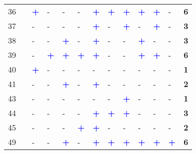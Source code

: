 \begin{longtable}{p{0.5cm}p{4.6cm}p{0.3cm}p{0.3cm}p{0.3cm}p{0.3cm}p{0.3cm}p{0.3cm}p{0.3cm}p{0.3cm}p{0.3cm}p{0.3cm}p{1cm}}
    \small{36} & \small{\textcite{cheng_expanding_2018}}\index{Cheng, Yung-Hsiang|pagebf} & \textcolor{blue}{\textbf{+}} & - & - & - & \textcolor{blue}{\textbf{+}} & \textcolor{blue}{\textbf{+}} & \textcolor{blue}{\textbf{+}} & \textcolor{blue}{\textbf{+}} & \textcolor{blue}{\textbf{+}} & - & \textbf{6}\\
    \small{37} & \small{\textcite{cheng_evaluating_2012}}\index{Cheng, Yung-Hsiang|pagebf} & - & - & - & - & \textcolor{blue}{\textbf{+}} & - & \textcolor{blue}{\textbf{+}} & - & \textcolor{blue}{\textbf{+}} & - & \textbf{3}\\
    \small{38} & \small{\textcite{cho_estimation_2022}}\index{Cho, Shin-Hyung|pagebf} & - & - & \textcolor{blue}{\textbf{+}} & - & \textcolor{blue}{\textbf{+}} & - & - & \textcolor{blue}{\textbf{+}} & - & - & \textbf{3}\\
    \small{39} & \small{\textcite{chu_last_2021}}\index{Chu, Junhong|pagebf} & - & \textcolor{blue}{\textbf{+}} & \textcolor{blue}{\textbf{+}} & \textcolor{blue}{\textbf{+}} & \textcolor{blue}{\textbf{+}} & - & - & \textcolor{blue}{\textbf{+}} & \textcolor{blue}{\textbf{+}} & - & \textbf{6}\\
    \small{40} & \small{\textcite{cooke_relationship_2018}}\index{Cooke, Sean|pagebf} & \textcolor{blue}{\textbf{+}} & - & - & - & - & - & - & - & - & - & \textbf{1}\\
    \small{41} & \small{\textcite{cottrell_transforming_2007}}\index{Cottrell, Wayne D.|pagebf} & - & - & \textcolor{blue}{\textbf{+}} & - & \textcolor{blue}{\textbf{+}} & - & - & - & - & - & \textbf{2}\\
    \small{43} & \small{\textcite{souza_modelling_2017}}\index{Souza, Flavia de|pagebf} & - & - & - & - & - & - & \textcolor{blue}{\textbf{+}} & - & - & - & \textbf{1}\\
    \small{44} & \small{\textcite{debrezion_modelling_2009}}\index{Debrezion, Ghebreegziabiher|pagebf} & - & - & - & - & \textcolor{blue}{\textbf{+}} & \textcolor{blue}{\textbf{+}} & \textcolor{blue}{\textbf{+}} & - & - & - & \textbf{3}\\
    \small{45} & \small{\textcite{djurhuus_building_2016}}\index{Djurhuus, Sune|pagebf} & - & - & - & \textcolor{blue}{\textbf{+}} & \textcolor{blue}{\textbf{+}} & - & - & - & - & - & \textbf{2}\\
    \small{49} & \small{\textcite{fan_how_2019}}\index{Fan, Aihua|pagebf} & - & - & \textcolor{blue}{\textbf{+}} & - & \textcolor{blue}{\textbf{+}} & \textcolor{blue}{\textbf{+}} & \textcolor{blue}{\textbf{+}} & \textcolor{blue}{\textbf{+}} & \textcolor{blue}{\textbf{+}} & \textcolor{blue}{\textbf{+}} & \textbf{6}\\

\end{longtable}
